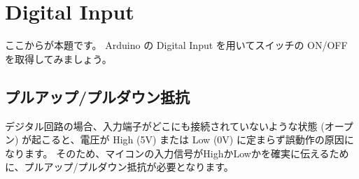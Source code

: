\documentclass[11pt,a4paper]{jarticle}
\begin{document}
%
%
%
%
% 
% 
% 
%
%

\newpage
\section{Digital Input}
ここからが本題です。
Arduino の Digital Input を用いてスイッチの ON/OFF を取得してみましょう。

\subsection*{プルアップ/プルダウン抵抗}
デジタル回路の場合、入力端子がどこにも接続されていないような状態 (オープン) が起こると、電圧が High (5V) または Low (0V) に定まらず誤動作の原因になります。
そのため、マイコンの入力信号がHighかLowかを確実に伝えるために、プルアップ/プルダウン抵抗が必要となります。

\end{document}
